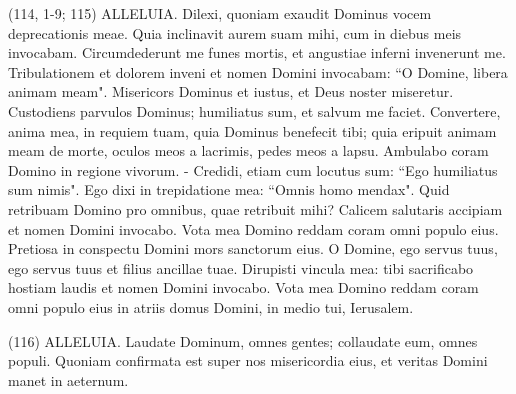 \begin{biblechapter}  (114, 1-9; 115) 
\verse ALLELUIA. Dilexi, quoniam exaudit Dominus vocem deprecationis meae. 
\verse Quia inclinavit aurem suam mihi, cum in diebus meis invocabam. 
\verse Circumdederunt me funes mortis, et angustiae inferni invenerunt me. Tribulationem et dolorem inveni 
\verse et nomen Domini invocabam: “O Domine, libera animam meam". 
\verse Misericors Dominus et iustus, et Deus noster miseretur. 
\verse Custodiens parvulos Dominus; humiliatus sum, et salvum me faciet. 
\verse Convertere, anima mea, in requiem tuam, quia Dominus benefecit tibi; 
\verse quia eripuit animam meam de morte, oculos meos a lacrimis, pedes meos a lapsu. 
\verse Ambulabo coram Domino in regione vivorum. - 
\verse Credidi, etiam cum locutus sum: “Ego humiliatus sum nimis". 
\verse Ego dixi in trepidatione mea: “Omnis homo mendax". 
\verse Quid retribuam Domino pro omnibus, quae retribuit mihi? 
\verse Calicem salutaris accipiam et nomen Domini invocabo. 
\verse Vota mea Domino reddam coram omni populo eius. 
\verse Pretiosa in conspectu Domini mors sanctorum eius. 
\verse O Domine, ego servus tuus, ego servus tuus et filius ancillae tuae. Dirupisti vincula mea: 
\verse tibi sacrificabo hostiam laudis et nomen Domini invocabo. 
\verse Vota mea Domino reddam coram omni populo eius 
\verse in atriis domus Domini, in medio tui, Ierusalem. 
\end{biblechapter}

\begin{biblechapter}  (116) 
\verse ALLELUIA. Laudate Dominum, omnes gentes; collaudate eum, omnes populi. 
\verse Quoniam confirmata est super nos misericordia eius, et veritas Domini manet in aeternum. 
\end{biblechapter}


